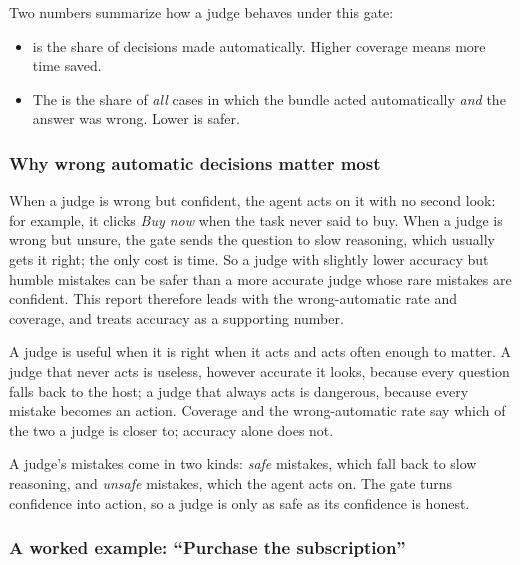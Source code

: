 Two numbers summarize how a judge behaves under this gate:
\begin{itemize}
  \item {} is the share of decisions made automatically. Higher coverage means more time
    saved.
  \item The  is the share of \emph{all} cases in which the bundle acted
    automatically \emph{and} the answer was wrong. Lower is safer.
\end{itemize}

\subsubsection{Why wrong automatic decisions matter most}

When a judge is wrong but confident, the agent acts on it with no second look: for example, it clicks
\emph{Buy now} when the task never said to buy. When a judge is wrong but unsure, the gate sends the
question to slow reasoning, which usually gets it right; the only cost is time. So a judge with slightly
lower accuracy but humble mistakes can be safer than a more accurate judge whose rare mistakes are
confident. This report therefore leads with the wrong-automatic rate and coverage, and treats accuracy as
a supporting number.

\begin{keyidea}[title={Accuracy alone is the wrong headline for a judge}]
A judge is useful when it is right when it acts and acts often enough to matter. A judge that never acts is useless,
however accurate it looks, because every question falls back to the host; a judge that always acts is dangerous,
because every mistake becomes an action. Coverage and the wrong-automatic rate say which of the two a judge is closer
to; accuracy alone does not.
\end{keyidea}

\begin{keyidea}
A judge's mistakes come in two kinds: \emph{safe} mistakes, which fall back to slow reasoning, and
\emph{unsafe} mistakes, which the agent acts on. The gate turns confidence into action, so a judge is
only as safe as its confidence is honest.
\end{keyidea}

\subsubsection{A worked example: ``Purchase the subscription''}\label{jb:sec:worked}

